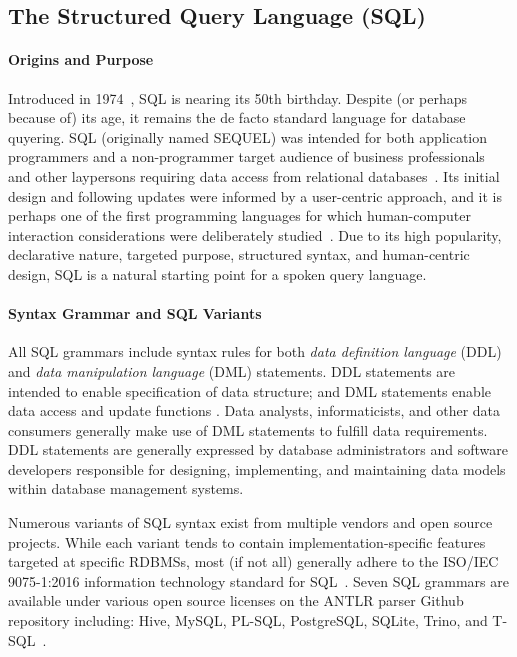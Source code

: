 \subsection{The Structured Query Language (SQL)}

\paragraph{\textbf{Origins and Purpose}}

Introduced in 1974~\cite{Chamberlin1974}, SQL is nearing its 50th birthday. Despite (or perhaps because of) its age, it remains the de facto standard language for database quyering. SQL (originally named SEQUEL) was intended for both application programmers and a non-programmer target audience of business professionals and other laypersons requiring data access from relational databases~\cite{Chamberlin1976}. Its initial design and following updates were informed by a user-centric approach, and it is perhaps one of the first programming languages for which human-computer interaction considerations were deliberately studied~\cite{Reisner1975,Reisner1977}. Due to its high popularity, declarative nature, targeted purpose, structured syntax, and human-centric design, SQL is a natural starting point for a spoken query language.

\paragraph{\textbf{Syntax Grammar and SQL Variants}}

All SQL grammars include syntax rules for both \emph{data definition language} (DDL) and \emph{data manipulation language} (DML) statements. DDL statements are intended to enable specification of data structure; and DML statements enable data access and update functions \cite{DBLP:books/aw/AbiteboulHV95}. Data analysts, informaticists, and other data consumers generally make use of DML statements to fulfill data requirements. DDL statements are generally expressed by database administrators and software developers responsible for designing, implementing, and maintaining data models within database management systems. 

Numerous variants of SQL syntax exist from multiple vendors and open source projects. While each variant tends to contain implementation-specific features targeted at specific RDBMSs, most (if not all) generally adhere to the ISO/IEC 9075-1:2016 information technology standard for SQL~\cite{kelechava_2020}. Seven SQL grammars are available under various open source licenses on the ANTLR parser Github repository including: Hive, MySQL, PL-SQL, PostgreSQL, SQLite, Trino, and T-SQL~\cite{antlrgrammarsv4}.


